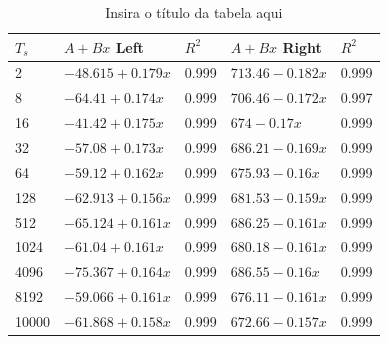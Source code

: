 \documentclass[11pt,a4paper]{article} %
\begin{document}
        \begin{table}[H] %
            \caption{Insira o título da tabela aqui} %
            \label{tab:unique_label} %
            \centering %
            \begin{tabular}{lllll}
                \hline
                \(T_{s}\) & \(A + Bx\) Left & \(R^{2}\) & \(A + Bx\) Right & \(R^{2}\) \\ \hline
                2    & \(-48.615 + 0.179x\) & 0.999 & \(713.46 - 0.182x\) & 0.999 \\
                8    & \(-64.41 + 0.174x\)  & 0.999 & \(706.46 - 0.172x\) & 0.997 \\
                16   & \(-41.42 + 0.175x\)  & 0.999 & \(674 - 0.17x\)     & 0.999 \\
                32   & \(-57.08 + 0.173x\)  & 0.999 & \(686.21 - 0.169x\) & 0.999 \\
                64   & \(-59.12 + 0.162x\)  & 0.999 & \(675.93 - 0.16x\)  & 0.999 \\
                128  & \(-62.913 + 0.156x\) & 0.999 & \(681.53 - 0.159x\) & 0.999 \\
                512  & \(-65.124 + 0.161x\) & 0.999 & \(686.25 - 0.161x\) & 0.999 \\
                1024 & \(-61.04 + 0.161x\)  & 0.999 & \(680.18 - 0.161x\) & 0.999 \\
                4096 & \(-75.367 + 0.164x\) & 0.999 & \(686.55 - 0.16x\)  & 0.999 \\
                8192 & \(-59.066 + 0.161x\) & 0.999 & \(676.11 - 0.161x\) & 0.999 \\
                10000& \(-61.868 + 0.158x\) & 0.999 & \(672.66 - 0.157x\) & 0.999 \\ \hline
            \end{tabular}
        \end{table}
        

        
\end{document}
